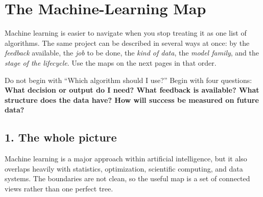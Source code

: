 
\chapter*{The Machine-Learning Map}

Machine learning is easier to navigate when you stop treating it as one list of algorithms. The same project can be described in several ways at once: by the \emph{feedback} available, the \emph{job} to be done, the \emph{kind of data}, the \emph{model family}, and the \emph{stage of the lifecycle}. Use the maps on the next pages in that order.

\begin{keyidea}
Do not begin with ``Which algorithm should I use?'' Begin with four questions: \textbf{What decision or output do I need? What feedback is available? What structure does the data have? How will success be measured on future data?}
\end{keyidea}

\section*{1. The whole picture}

Machine learning is a major approach within artificial intelligence, but it also overlaps heavily with statistics, optimization, scientific computing, and data systems. The boundaries are not clean, so the useful map is a set of connected views rather than one perfect tree.

